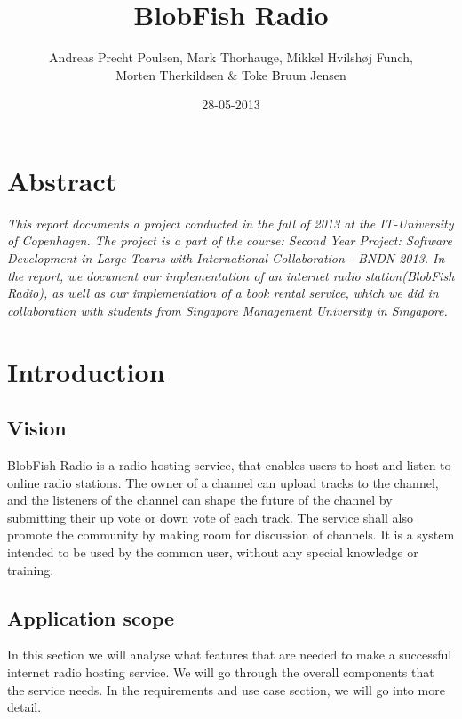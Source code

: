 \documentclass[a4paper,11pt,report]{article}
\begin{document}
\title{BlobFish Radio}
\author{Andreas Precht Poulsen, Mark Thorhauge, Mikkel Hvilsh\o j Funch,\\Morten Therkildsen \& Toke Bruun Jensen}
\date{28-05-2013}
\maketitle
\newpage
\section*{Abstract}
\emph{
This report documents a project conducted in the fall of 2013 at the IT-University of Copenhagen. The project is a part of the course: Second Year Project: Software Development in Large Teams with International Collaboration - BNDN 2013. In the report, we document our implementation of an internet radio station(BlobFish Radio), as well as our implementation of a book rental service, which we did in collaboration with students from Singapore Management University in Singapore.}\\ 
\newpage

\tableofcontents
\newpage
\section{Introduction}
\subsection{Vision}
BlobFish Radio is a radio hosting service, that enables users to host and listen to online radio stations. The owner of a channel can upload tracks to the channel, and the listeners of the channel can shape the future of the channel by submitting their up vote or down vote of each track. The service shall also promote the community by making room for discussion of channels.
It is a system intended to be used by the common user, without any special knowledge or training.

\subsection{Application scope}
In this section we will analyse what features that are needed to make a successful internet radio hosting service. We will go through the overall components that the service needs. In the requirements and use case section, we will go into more detail.
\end{document}
